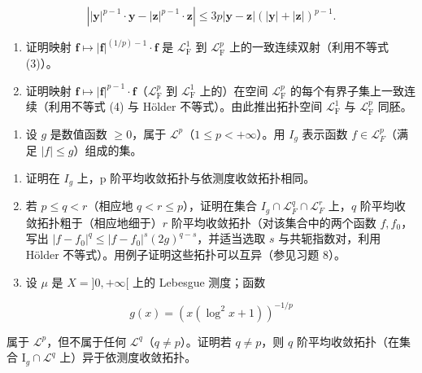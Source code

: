\[
\left| | \mathbf {y} | ^ {p - 1} \cdot \mathbf {y} - | \mathbf {z} | ^ {p - 1} \cdot \mathbf {z} \right| \leqslant 3 p | \mathbf {y} - \mathbf {z} | (| \mathbf {y} | + | \mathbf {z} |) ^ {p - 1}.\tag{4}
\]

\begin{enumerate}
\def\labelenumi{\alph{enumi})}
\setcounter{enumi}{1}
\item
  证明映射 \(\mathbf{f} \mapsto |\mathbf{f}|^{(1/p)-1} \cdot \mathbf{f}\) 是 \(\mathcal{L}_{\mathrm{F}}^{1}\) 到 \(\mathcal{L}_{\mathrm{F}}^{p}\) 上的一致连续双射（利用不等式 (3)）。
\item
  证明映射 \(\mathbf{f} \mapsto |\mathbf{f}|^{p-1} \cdot \mathbf{f}\)（\(\mathcal{L}_{\mathrm{F}}^{p}\) 到 \(\mathcal{L}_{\mathrm{F}}^{1}\) 上的）在空间 \(\mathcal{L}_{\mathrm{F}}^{p}\) 的每个有界子集上一致连续（利用不等式 (4) 与 Hölder 不等式）。由此推出拓扑空间 \(\mathcal{L}_{\mathrm{F}}^{1}\) 与 \(\mathcal{L}_{\mathrm{F}}^{p}\) 同胚。
\end{enumerate}

\begin{enumerate}
\def\labelenumi{\arabic{enumi})}
\setcounter{enumi}{10}
\tightlist
\item
  设 \(g\) 是数值函数 \(\geqslant 0\)，属于 \(\mathcal{L}^p\)（\(1 \leqslant p < +\infty\)）。用 \(I_g\) 表示函数 \(f \in \mathcal{L}_F^p\)（满足 \(|f| \leqslant g\)）组成的集。
\end{enumerate}

\begin{enumerate}
\def\labelenumi{\alph{enumi})}
\item
  证明在 \(I_{g}\) 上，p 阶平均收敛拓扑与依测度收敛拓扑相同。
\item
  若 \(p \leqslant q < r\)（相应地 \(q < r \leqslant p\)），证明在集合 \(I_g \cap \mathcal{L}_F^q \cap \mathcal{L}_F^r\) 上，\(q\) 阶平均收敛拓扑粗于（相应地细于）\(r\) 阶平均收敛拓扑（对该集合中的两个函数 \(f, f_0\)，写出 \(|f - f_0|^q \leqslant |f - f_0|^s(2g)^{q-s}\)，并适当选取 \(s\) 与共轭指数对，利用 Hölder 不等式）。用例子证明这些拓扑可以互异（参见习题 8）。
\item
  设 \(\mu\) 是 \(X = ]0, +\infty[\) 上的 Lebesgue 测度；函数
\end{enumerate}

\[
g (x) = \left(x (\log^ {2} x + 1)\right) ^ {- 1 / p}
\]

属于 \(\mathcal{L}^p\)，但不属于任何 \(\mathcal{L}^q\)（\(q \neq p\)）。证明若 \(q \neq p\)，则 \(q\) 阶平均收敛拓扑（在集合 \(\mathrm{I}_g \cap \mathcal{L}^q\) 上）异于依测度收敛拓扑。

